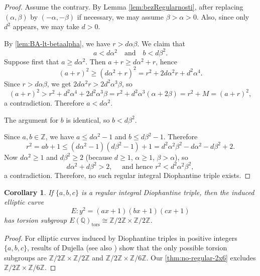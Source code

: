 \documentclass{article}
\theoremstyle{plain}
\newtheorem{corollary}[theorem]{Corollary}
\newcommand{\Z}{\mathbb{Z}}
\newcommand{\Q}{\mathbb{Q}}
\newcommand{\twotimessix}{\Z/2\Z \times \Z/6\Z}
\begin{document}
\begin{proof}
Assume the contrary. By Lemma \ref{lem:bezRegularnosti}, after replacing \((\alpha,\beta)\) by \((-\alpha,-\beta)\) if necessary, we may assume
\(
\beta>\alpha>0
\).
Also, since only \(d^2\) appears, we may take \(d>0\).

By \cref{lem:BA-lt-betaalpha}, we have
\(
r>d\alpha\beta\). We claim that
\[
a<d\alpha^2
\quad\text{and}\quad
b<d\beta^2.
\]
Suppose first that \(a\geqslant d\alpha^2\). Then
\(
a+r\geqslant d\alpha^2+r\), hence
\[
(a+r)^2\geqslant (d\alpha^2+r)^2
= r^2+2d\alpha^2r+d^2\alpha^4.
\]
Since \(r>d\alpha\beta\), we get
\(
2d\alpha^2r>2d^2\alpha^3\beta\),
so
\[
(a+r)^2>r^2+d^2\alpha^4+2d^2\alpha^3\beta
= r^2+d^2\alpha^3(\alpha+2\beta)=r^2+M=(a+r)^2,
\]
a contradiction. Therefore
\(
a<d\alpha^2\).

The argument for \(b\) is identical,
so
\( b<d\beta^2 \).

Since \(a,b\in\Z\), we have
\(
a\leqslant d\alpha^2-1\) and \(b\leqslant d\beta^2-1\).
Therefore
\[
r^2=ab+1
\leqslant (d\alpha^2-1)(d\beta^2-1)+1
= d^2\alpha^2\beta^2-d\alpha^2-d\beta^2+2.
\]
Now \(d\alpha^2\geqslant 1\) and \(d\beta^2\geqslant 2\) (because \(d\geqslant 1\), \(\alpha\geqslant 1\),
\(\beta>\alpha\)), so
\[
d\alpha^2+d\beta^2>2, \quad
\text{ and hence } 
r^2<d^2\alpha^2\beta^2,
\]
a contradiction. Therefore, no such regular integral Diophantine triple exists.
\end{proof}

\begin{corollary}
If \(\{a,b,c\}\) is a regular integral Diophantine triple, then the induced elliptic curve
\[
E:y^2=(ax+1)(bx+1)(cx+1)
\]
has torsion subgroup \( E(\Q)_{\text{tors}} \cong \Z/2\Z\times \Z/2\Z\).
\end{corollary}
\begin{proof}
    For elliptic curves induced by Diophantine triples in positive integers $\{a, b, c\}$, results of Dujella \cite[Theorem 2]{DujeJTNB} (see also \cite{DujeiMiljen}) show that the only possible torsion subgroups are $\Z/2\Z \times \Z/2\Z$ and $\Z/2\Z \times \Z/6\Z$. Our \cref{thm:no-regular-2x6} excludes \(\twotimessix\).
\end{proof}
\end{document}
